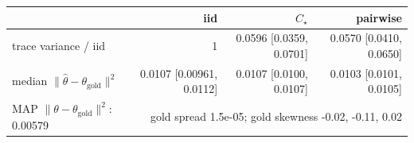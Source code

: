 \begin{tabular}{lrrr}
\toprule
 & iid & $C_\star$ & pairwise \\
\midrule
trace variance / iid & 1 & 0.0596 [0.0359, 0.0701] & 0.0570 [0.0410, 0.0650] \\
median $\|\widehat\theta-\theta_{\mathrm{gold}}\|^2$ & 0.0107 [0.00961, 0.0112] & 0.0107 [0.0100, 0.0107] & 0.0103 [0.0101, 0.0105] \\
\midrule
MAP $\|\theta-\theta_{\mathrm{gold}}\|^2$: 0.00579 & \multicolumn{3}{r}{gold spread 1.5e-05; gold skewness -0.02, -0.11, 0.02} \\
\bottomrule
\end{tabular}
